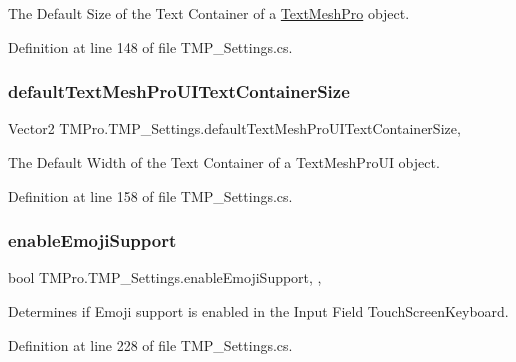 The Default Size of the Text Container of a \mbox{\hyperlink{class_t_m_pro_1_1_text_mesh_pro}{Text\+Mesh\+Pro}} object. 



Definition at line 148 of file T\+M\+P\+\_\+\+Settings.\+cs.

\mbox{\label{class_t_m_pro_1_1_t_m_p___settings_a569c6d3b17242a88608906822f485ec6}} 
\subsubsection{\texorpdfstring{defaultTextMeshProUITextContainerSize}{defaultTextMeshProUITextContainerSize}}
{\footnotesize\ttfamily Vector2 T\+M\+Pro.\+T\+M\+P\+\_\+\+Settings.\+default\+Text\+Mesh\+Pro\+U\+I\+Text\+Container\+Size\hspace{0.3cm}{\ttfamily [static]}, {\ttfamily [get]}}



The Default Width of the Text Container of a Text\+Mesh\+Pro\+UI object. 



Definition at line 158 of file T\+M\+P\+\_\+\+Settings.\+cs.

\mbox{\label{class_t_m_pro_1_1_t_m_p___settings_a6648f385cc57147ebb46f8cd159e78c9}} 
\subsubsection{\texorpdfstring{enableEmojiSupport}{enableEmojiSupport}}
{\footnotesize\ttfamily bool T\+M\+Pro.\+T\+M\+P\+\_\+\+Settings.\+enable\+Emoji\+Support\hspace{0.3cm}{\ttfamily [static]}, {\ttfamily [get]}, {\ttfamily [set]}}



Determines if Emoji support is enabled in the Input Field Touch\+Screen\+Keyboard. 



Definition at line 228 of file T\+M\+P\+\_\+\+Settings.\+cs.


